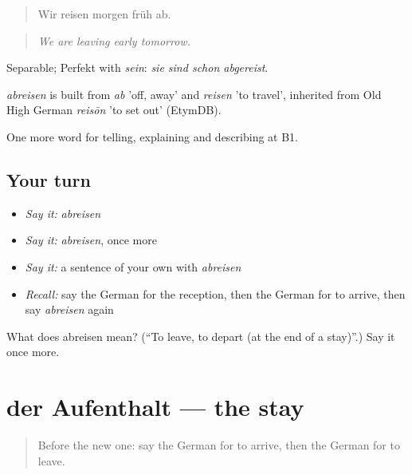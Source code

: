 \begin{quote}
Wir reisen morgen früh ab.
\end{quote}

\begin{quote}
\emph{We are leaving early tomorrow.}
\end{quote}

Separable; Perfekt with \emph{sein}: \emph{sie sind schon abgereist}.

\begin{cousinweb}
\emph{abreisen} is built from \emph{ab} 'off, away' and \emph{reisen} 'to travel', inherited from Old High German \emph{reisōn} 'to set out' (EtymDB).
\end{cousinweb}

\begin{grammarlens}[title={What you've built}]
One more word for telling, explaining and describing at B1.
\end{grammarlens}

\subsection*{Your turn}
\begin{itemize}
\raggedright
  \item \emph{Say it:} \emph{abreisen}
  \item \emph{Say it:} \emph{abreisen}, once more
  \item \emph{Say it:} a sentence of your own with \emph{abreisen}
  \item \emph{Recall:} say the German for the reception, then the German for to arrive, then say \emph{abreisen} again
\end{itemize}

\begin{tcolorbox}[breakable,colback=teal!4,colframe=teal!35!black,title={Before you move on}]
What does abreisen mean? (\textquotedblleft{}To leave, to depart (at the end of a stay)\textquotedblright{}.) Say it once more.
\end{tcolorbox}
\section[der Aufenthalt]{der Aufenthalt — the stay}

\label{lesson:GE-C426-aufenthalt}



\begin{quote}
Before the new one: say the German for to arrive, then the German for to leave.
\end{quote}

